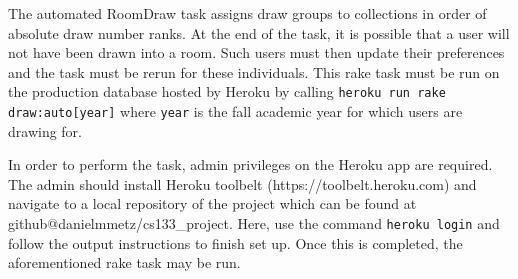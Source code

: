 The automated RoomDraw task assigns draw groups to collections in order of absolute draw number ranks. At the end of the task, it is possible that a user will not have been drawn into a room. Such users must then update their preferences and the task must be rerun for these individuals. This rake task must be run on the production database hosted by Heroku by calling \texttt{heroku run rake draw:auto[year]} where \texttt{year} is the fall academic year for which users are drawing for.

In order to perform the task, admin privileges on the Heroku app are required. The admin should install Heroku toolbelt (https://toolbelt.heroku.com) and navigate to a local repository of the project which can be found at github@danielmmetz/cs133\_project. Here, use the command \texttt{heroku login} and follow the output instructions to finish set up. Once this is completed, the aforementioned rake task may be run.